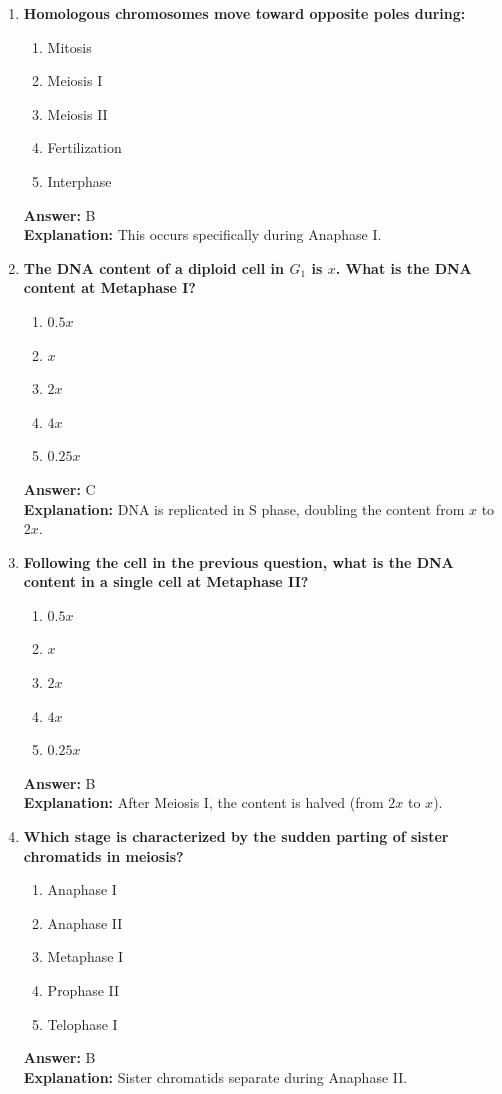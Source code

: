 \documentclass[11pt, a4paper]{article}
\begin{document}
\begin{enumerate}[leftmargin=*, label=\arabic*.]
\item \textbf{Homologous chromosomes move toward opposite poles during:}
\begin{enumerate}[label=\Alph*.]
\item Mitosis
\item Meiosis I
\item Meiosis II
\item Fertilization
\item Interphase
\end{enumerate}
\textbf{Answer:} B \\
\textbf{Explanation:} This occurs specifically during Anaphase I.

\item \textbf{The DNA content of a diploid cell in $G_1$ is $x$. What is the DNA content at Metaphase I?}
\begin{enumerate}[label=\Alph*.]
\item $0.5x$
\item $x$
\item $2x$
\item $4x$
\item $0.25x$
\end{enumerate}
\textbf{Answer:} C \\
\textbf{Explanation:} DNA is replicated in S phase, doubling the content from $x$ to $2x$.

\item \textbf{Following the cell in the previous question, what is the DNA content in a single cell at Metaphase II?}
\begin{enumerate}[label=\Alph*.]
\item $0.5x$
\item $x$
\item $2x$
\item $4x$
\item $0.25x$
\end{enumerate}
\textbf{Answer:} B \\
\textbf{Explanation:} After Meiosis I, the content is halved (from $2x$ to $x$).

\item \textbf{Which stage is characterized by the sudden parting of sister chromatids in meiosis?}
\begin{enumerate}[label=\Alph*.]
\item Anaphase I
\item Anaphase II
\item Metaphase I
\item Prophase II
\item Telophase I
\end{enumerate}
\textbf{Answer:} B \\
\textbf{Explanation:} Sister chromatids separate during Anaphase II.


\end{enumerate}
\end{document}
